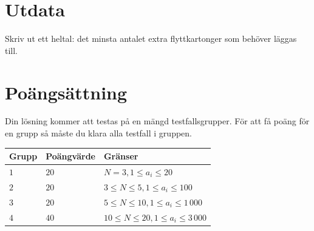 \section*{Utdata}
Skriv ut ett heltal: det minsta antalet extra flyttkartonger som behöver läggas till.


\section*{Poängsättning}
Din lösning kommer att testas på en mängd testfallsgrupper.
För att få poäng för en grupp så måste du klara alla testfall i gruppen.

\noindent
\begin{tabular}{| l | l | l |}
  \hline
  Grupp & Poängvärde & Gränser \\ \hline
  $1$   & $20$       & $N=3, 1 \leq a_i \leq 20$ \\ \hline
  $2$   & $20$       & $3 \leq N \leq 5, 1 \leq a_i \leq 100$ \\ \hline
  $3$   & $20$       & $5 \leq N \leq 10, 1 \leq a_i \leq 1\,000$ \\ \hline
  $4$   & $40$       & $10 \leq N \leq 20, 1 \leq a_i \leq 3\,000$ \\ \hline
\end{tabular}
